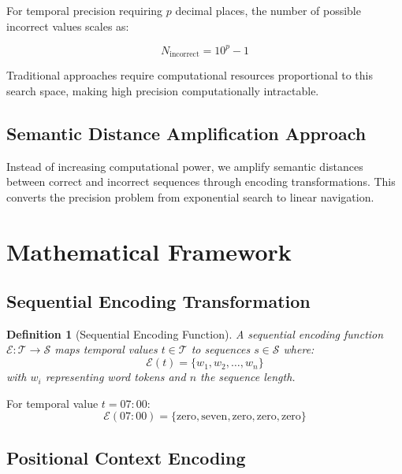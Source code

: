 \documentclass[12pt,a4paper]{article}
\newtheorem{definition}{Definition}
\begin{document}
For temporal precision requiring $p$ decimal places, the number of possible incorrect values scales as:

\begin{equation}
N_{\text{incorrect}} = 10^p - 1
\end{equation}

Traditional approaches require computational resources proportional to this search space, making high precision computationally intractable.

\subsection{Semantic Distance Amplification Approach}

Instead of increasing computational power, we amplify semantic distances between correct and incorrect sequences through encoding transformations. This converts the precision problem from exponential search to linear navigation.

\section{Mathematical Framework}

\subsection{Sequential Encoding Transformation}

\begin{definition}[Sequential Encoding Function]
A sequential encoding function $\mathcal{E}: \mathcal{T} \to \mathcal{S}$ maps temporal values $t \in \mathcal{T}$ to sequences $s \in \mathcal{S}$ where:
\begin{equation}
\mathcal{E}(t) = \{w_1, w_2, \ldots, w_n\}
\end{equation}
with $w_i$ representing word tokens and $n$ the sequence length.
\end{definition}

\begin{example}
For temporal value $t = 07:00$:
\begin{equation}
\mathcal{E}(07:00) = \{\text{zero}, \text{seven}, \text{zero}, \text{zero}, \text{zero}\}
\end{equation}
\end{example}

\subsection{Positional Context Encoding}
\end{document}
